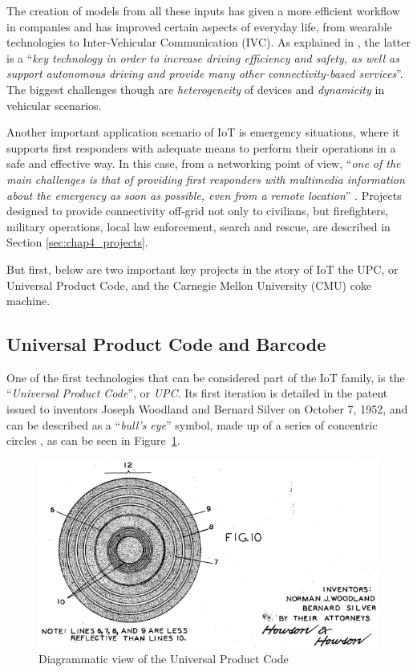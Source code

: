 		The creation of models from all these inputs has given a more efficient workflow in companies and has improved certain aspects of everyday life, from wearable technologies to Inter-Vehicular Communication (IVC).
		As explained in \cite{BUJARI2020101204}, the latter is a ``\textit{key technology in order to increase driving efficiency and safety, as well as	support autonomous driving and provide many other connectivity-based services}''.
		The biggest challenges though are \textit{heterogeneity} of devices and \textit{dynamicity} in vehicular scenarios.
		
		Another important application scenario of IoT is emergency situations, where it supports first responders with adequate means to perform their operations in a safe  and effective way.
		In this case, from a networking point of view, ``\textit{one of the main challenges is that of providing first responders with multimedia information about the emergency as soon as possible, even from a remote location}'' \cite{4197976}.
		Projects designed to provide connectivity off-grid not only to civilians, but firefighters, military operations, local law enforcement, search and rescue, are described in Section \ref{sec:chap4_projects}.

		But first, below are two important key projects in the story of IoT the UPC, or Universal Product Code, and the Carnegie Mellon University (CMU) coke machine.
		
		\subsection{Universal Product Code and Barcode}
	
			One of the first technologies that can be considered part of the IoT family, is the ``\textit{Universal Product Code}'', or \textit{UPC}.
			Its first iteration is detailed in the patent issued to inventors Joseph Woodland and Bernard Silver on October 7, 1952, and can be described as a ``\textit{bull's eye}'' symbol, made up of a series of concentric circles \cite{upc_patent}, as can be seen in Figure~\ref{img:upc_patent}.
			
			\begin{figure}[h]
				\centering
				\includegraphics[width=\textwidth-4cm]{resources/img/chap2/upc_1}
				\caption[Diagrammatic view of the Universal Product Code]{Diagrammatic view of the Universal Product Code \cite{upc_patent}}
				\label{img:upc_patent}
			\end{figure}
			
